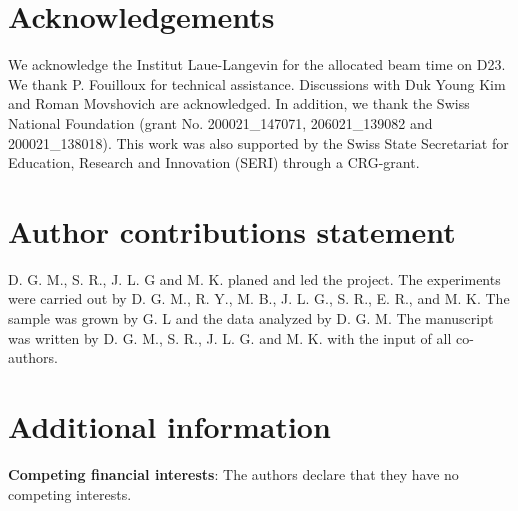 \documentclass[article,twocolumn,showpacs,preprintnumbers,amsmath,amssymb, superscriptaddress]{revtex4-1}
\begin{document}
\section*{Acknowledgements}

We acknowledge the Institut Laue-Langevin for the allocated beam time on D23. We thank P. Fouilloux for technical assistance. Discussions with Duk Young Kim and Roman Movshovich are acknowledged. In addition, we thank the Swiss National Foundation (grant No. 200021\_147071, 206021\_139082 and 200021\_138018). This work was also supported by the Swiss State Secretariat for Education, Research and Innovation (SERI) through a CRG-grant.

\section*{Author contributions statement}
D. G. M., S. R., J. L. G and M. K. planed and led the project. The experiments were carried out by D. G. M., R. Y., M. B., J. L. G., S. R., E. R., and M. K. The sample was grown by G. L and the data analyzed by D. G. M. The manuscript was written by D. G. M., S. R., J. L. G. and M. K. with the input of all co-authors.

\section*{Additional information}

\textbf{Competing financial interests}: The authors declare that they have no competing interests. 
\end{document}
